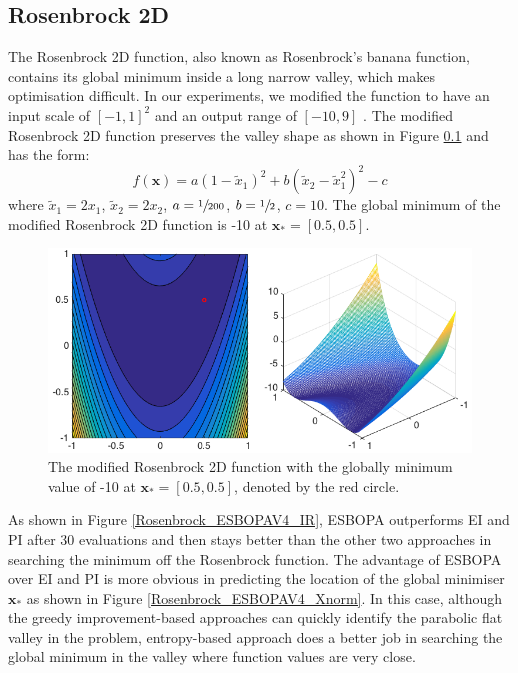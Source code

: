 \documentclass[a4paper,11pt]{report}
\begin{document}
\subsection{Rosenbrock 2D}
The Rosenbrock 2D function, also known as Rosenbrock's banana function, contains its global minimum inside a long narrow valley, which makes optimisation difficult. In our experiments, we modified the function to have an input scale of $ [-1,1]^2 $ and an output range of $[-10, 9]$ . The modified Rosenbrock 2D function preserves the valley shape as shown in Figure \ref{} and has the form:
\begin{equation}
f(\mathbf{x}) = a (1- \tilde x_1 )^2 + b ( \tilde x_2 - \tilde x_1^2) ^2 - c
\end{equation}
where $\tilde x_1 = 2 x_1$, $\tilde x_2 = 2 x_2$, $a=\sfrac{1}{200}$, $b=\sfrac{1}{2}$, $c=10$. The global minimum of the modified Rosenbrock 2D function is  -10 at $\mathbf{x}_*=[0.5, 0.5]$. 
\\
\begin{figure} [H]
\label{2Drosenbrock}
	\centering
	 \includegraphics[width=0.9\linewidth]{rosenbrock2D.png}
\caption{The modified Rosenbrock 2D function with the globally minimum value of -10 at $\mathbf{x}_*=[0.5, 0.5]$, denoted by the red circle.}
\end{figure}
\noindent
As shown in Figure \ref{Rosenbrock_ESBOPAV4_IR}, ESBOPA outperforms EI and PI after 30 evaluations and then stays better than the other two approaches in searching the minimum off the Rosenbrock function. The advantage of ESBOPA over EI and PI is more obvious in predicting the location of the global minimiser $\mathbf{x}_{*}$ as shown in Figure \ref{Rosenbrock_ESBOPAV4_Xnorm}. In this case, although the greedy improvement-based approaches can quickly identify the parabolic flat valley in the problem, entropy-based approach does a better job in searching the global minimum in the valley where function values are very close.
\\
\end{document}
